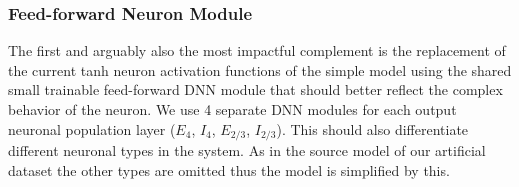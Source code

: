 \subsubsection{Feed-forward Neuron Module}
\label{subsubsec:dnn_neuron}
The first and arguably also the most impactful complement is the replacement of the current tanh neuron activation functions of the simple model using the shared small trainable feed-forward DNN module that should better reflect the complex behavior of the neuron. We use 4 separate DNN modules for each output neuronal population layer ($E_4$, $I_4$, $E_{2/3}$, $I_{2/3}$). This should also differentiate different neuronal types in the system. As in the source model of our artificial dataset the other types are omitted thus the model is simplified by this.